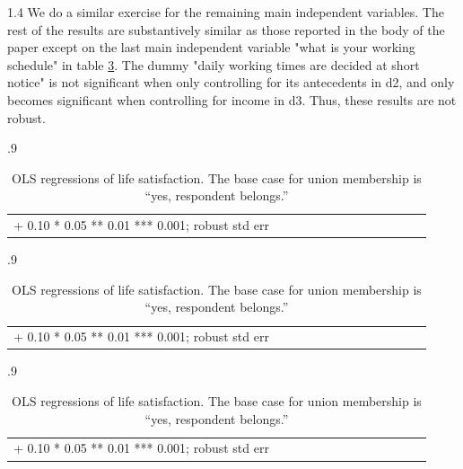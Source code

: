 \documentclass[10pt, letterpaper]{article}
\begin{document}
\begin{spacing}{1.4}
We do a similar exercise for the remaining main independent variables. The rest of the results are substantively similar as those reported in the body of the paper except on the last main independent variable "what is your working schedule" in
table \ref{c-d}.  The dummy "daily working times are decided at short notice" is not significant when only controlling for its antecedents in d2, and only becomes significant when controlling for income in d3. Thus, these results are not robust. 

\begin{spacing}{.9} \begin{table}[H]\centering   \begin{scriptsize} \begin{tabular}{p{1.8in}p{.5in}p{.5in}p{.5in}p{.5in}p{.5in}p{.5in}p{.5in}p{.5in}p{.5in}p{.5 in}p{.5in}p{.5 in}}\hline  \hline + 0.10 * 0.05 ** 0.01 *** 0.001; robust std err \end{tabular}\end{scriptsize}\caption{\label{c-b}OLS regressions of life satisfaction. The base case for union membership is ``yes, respondent belongs.''}\end{table} \end{spacing}

\begin{spacing}{.9} \begin{table}[H]\centering   \begin{scriptsize} \begin{tabular}{p{1.8in}p{.5in}p{.5in}p{.5in}p{.5in}p{.5in}p{.5in}p{.5in}p{.5in}p{.5in}p{.5 in}p{.5in}p{.5 in}}\hline  \hline + 0.10 * 0.05 ** 0.01 *** 0.001; robust std err \end{tabular}\end{scriptsize}\caption{\label{c-c}OLS regressions of life satisfaction. The base case for union membership is ``yes, respondent belongs.''}\end{table} \end{spacing}

\begin{spacing}{.9} \begin{table}[H]\centering   \begin{scriptsize} \begin{tabular}{p{1.8in}p{.5in}p{.5in}p{.5in}p{.5in}p{.5in}p{.5in}p{.5in}p{.5in}p{.5in}p{.5 in}p{.5in}p{.5 in}}\hline  \hline + 0.10 * 0.05 ** 0.01 *** 0.001; robust std err \end{tabular}\end{scriptsize}\caption{\label{c-d}OLS regressions of life satisfaction. The base case for union membership is ``yes, respondent belongs.''}\end{table} \end{spacing}



\end{spacing}
\end{document}
